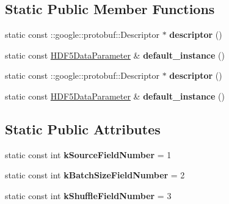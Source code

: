 \subsection*{Static Public Member Functions}
\begin{DoxyCompactItemize}
\item 
\mbox{\label{classcaffe_1_1_h_d_f5_data_parameter_ad63ef33657ca628e1b24d2f7ec1e97ab}} 
static const \+::google\+::protobuf\+::\+Descriptor $\ast$ {\bfseries descriptor} ()
\item 
\mbox{\label{classcaffe_1_1_h_d_f5_data_parameter_a6836750b3171346f37ace7c334ef3646}} 
static const \mbox{\hyperlink{classcaffe_1_1_h_d_f5_data_parameter}{H\+D\+F5\+Data\+Parameter}} \& {\bfseries default\+\_\+instance} ()
\item 
\mbox{\label{classcaffe_1_1_h_d_f5_data_parameter_ada21ea246e7aa2bb5e0803b971c4aa10}} 
static const \+::google\+::protobuf\+::\+Descriptor $\ast$ {\bfseries descriptor} ()
\item 
\mbox{\label{classcaffe_1_1_h_d_f5_data_parameter_a30b136445bb2377f7ccdd9ffef68c00d}} 
static const \mbox{\hyperlink{classcaffe_1_1_h_d_f5_data_parameter}{H\+D\+F5\+Data\+Parameter}} \& {\bfseries default\+\_\+instance} ()
\end{DoxyCompactItemize}
\subsection*{Static Public Attributes}
\begin{DoxyCompactItemize}
\item 
\mbox{\label{classcaffe_1_1_h_d_f5_data_parameter_aa53613e205e706e21c5583dcc57cfaa7}} 
static const int {\bfseries k\+Source\+Field\+Number} = 1
\item 
\mbox{\label{classcaffe_1_1_h_d_f5_data_parameter_a157593250af37bbb9ea4cc9a691d27d7}} 
static const int {\bfseries k\+Batch\+Size\+Field\+Number} = 2
\item 
\mbox{\label{classcaffe_1_1_h_d_f5_data_parameter_a31d7ad8a848fe3ade23f27d027425a74}} 
static const int {\bfseries k\+Shuffle\+Field\+Number} = 3
\end{DoxyCompactItemize}
